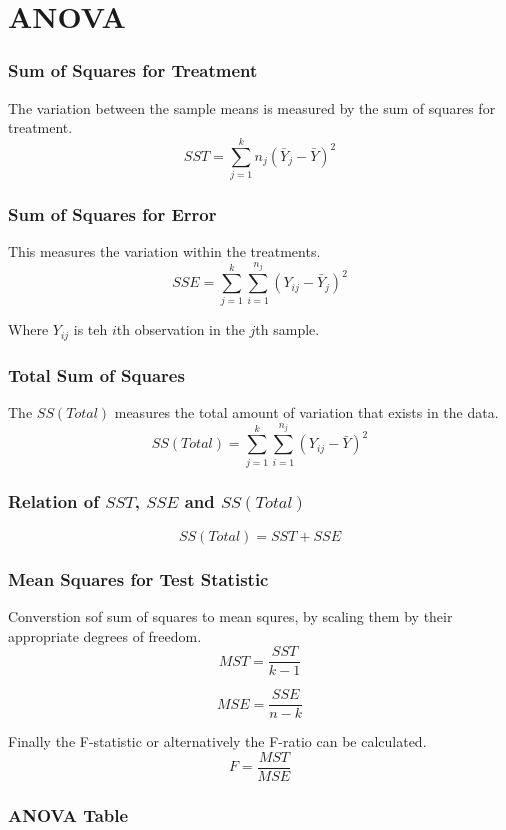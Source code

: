 \documentclass{article}
\begin{document}
\pagebreak

\section{ANOVA}

\subsubsection{Sum of Squares for Treatment}
The variation between the sample means is measured by the sum of squares for treatment.
$$
SST = \sum_{j=1}^k n_j(\bar{Y}_j - \bar{Y})^2
$$


\subsubsection{Sum of Squares for Error}
This measures the variation within the treatments.
$$
SSE = \sum_{j=1}^k \sum_{i=1}^{n_j} (Y_{ij} - \bar{Y}_j)^2
$$

Where $Y_{ij}$ is teh $i$th observation in the $j$th sample.

\subsubsection{Total Sum of Squares}
The $SS(Total)$ measures the total amount of variation that exists in the data.
$$
SS(Total) = \sum_{j=1}^k \sum_{i=1}^{n_j} (Y_{ij} - \bar{Y})^2
$$


\subsubsection{Relation of $SST$, $SSE$ and $SS(Total)$}

$$
SS(Total) = SST + SSE
$$

\subsubsection{Mean Squares for Test Statistic}
Converstion sof sum of squares to mean squres, by scaling them by their appropriate degrees of freedom.
$$
MST = \frac{SST}{k -1}
$$

$$
MSE = \frac{SSE}{n - k}
$$

Finally the F-statistic or alternatively the F-ratio can be calculated.
$$
F = \frac{MST}{MSE}
$$

\subsubsection{ANOVA Table}
\end{document}
